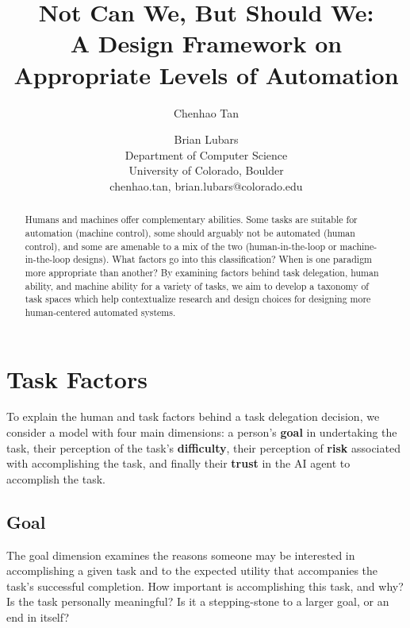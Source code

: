 \documentclass[letterpaper]{article} %
\begin{document}
%
\title{Not Can We, But Should We: \\A Design Framework on Appropriate Levels of Automation}

\author{Chenhao Tan \and Brian Lubars\\
Department of Computer Science\\
University of Colorado, Boulder\\
{chenhao.tan, brian.lubars}@colorado.edu\\
}


\maketitle
\begin{abstract}
Humans and machines offer complementary abilities. Some tasks are suitable for automation (machine control), some should arguably not be automated (human control), and some are amenable to a mix of the two (human-in-the-loop or machine-in-the-loop designs). What factors go into this classification? When is one paradigm more appropriate than another? By examining factors behind task delegation, human ability, and machine ability for a variety of tasks, we aim to develop a taxonomy of task spaces which help contextualize research and design choices for designing more human-centered automated systems.
\end{abstract}

\section{Task Factors}
To explain the human and task factors behind a task delegation decision, we consider a model with four main dimensions: a person's \textbf{goal} in undertaking the task, their perception of the task's \textbf{difficulty}, their perception of \textbf{risk} associated with accomplishing the task, and finally their \textbf{trust} in the AI agent to accomplish the task.

\subsection{Goal}
The goal dimension examines the reasons someone may be interested in accomplishing a given task and to the expected utility that accompanies the task's successful completion. How important is accomplishing this task, and why? Is the task personally meaningful? Is it a stepping-stone to a larger goal, or an end in itself? 
\end{document}
